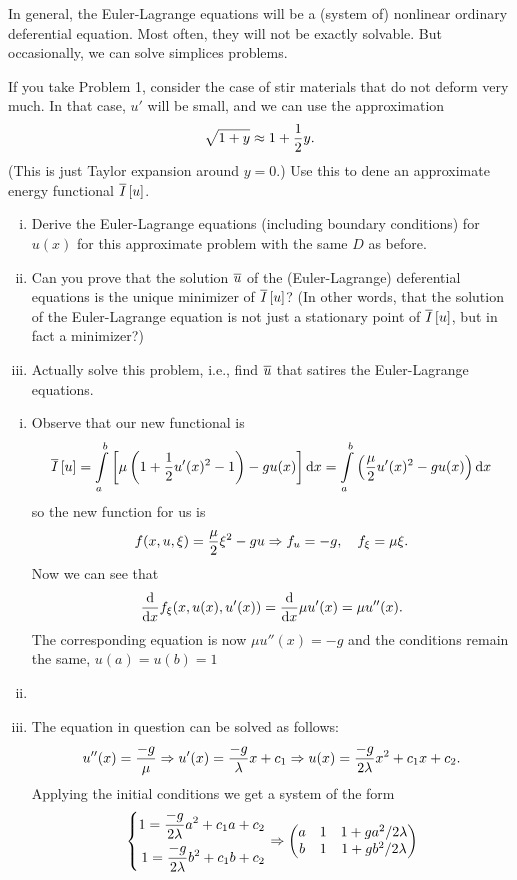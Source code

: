 \documentclass[12pt]{memoir}
\begin{document}
\begin{Ej}
    In general, the Euler-Lagrange equations will be a (system
    of) nonlinear ordinary deferential equation. Most often, they will not be exactly solvable. But occasionally,
    we can solve simplices problems.\par
    If you take Problem 1, consider the case of stir materials that do not deform very much. In that case, $u'$
    will be small, and we can use the approximation
    $$\sqrt{1+y}\approx 1+\half y.$$
    (This is just Taylor expansion around $y = 0$.) Use this to dene an approximate energy functional $\overline I\left\lbrack u\right\rbrack$.
    \begin{enumerate}[i)]
        \item Derive the Euler-Lagrange equations (including boundary conditions) for $u(x)$ for this approximate
        problem with the same $D$ as before.
        \item Can you prove that the solution $\overline u$ of the (Euler-Lagrange) deferential equations is the unique minimizer
        of $\overline I\left\lbrack u\right\rbrack$? (In other words, that the solution of the Euler-Lagrange equation is not just a stationary
        point of $\overline I\left\lbrack u\right\rbrack$, but in fact a minimizer?)
        \item Actually solve this problem, i.e., find $\overline u$ that satires the Euler-Lagrange equations.
    \end{enumerate}
\end{Ej}


\begin{ptcbr}
    \begin{enumerate}[i)]
        \item Observe that our new functional is 
        $$\ov I\bonj{u}=\int\limits_a^b \bonj{\mu\left(1+\half u'(x)^2-1\right)-gu(x)}\dd x=\int\limits_a^b \left(\frac{\mu}{2}u'(x)^2-gu(x)\right)\dd x$$
        so the new function for us is 
        $$f(x,u,\xi)=\frac{\mu}{2}\xi^2-gu\Rightarrow f_u=-g,\quad f_\xi=\mu\xi.$$
        Now we can see that
        $$\dv{x}f_{\xi}(x,u(x),u'(x))=\dv{x}\mu u'(x)=\mu u''(x).$$
        The corresponding equation is now $\mu u''(x)=-g$ and the conditions remain the same, $u(a)=u(b)=1$
        \item {}
        \item The equation in question can be solved as follows:
        $$u''(x)=\frac{-g}{\mu}\Rightarrow u'(x)=\frac{-g}{\lambda}x+c_1\Rightarrow u(x)=\frac{-g}{2\lambda}x^2+c_1x+c_2.$$
        Applying the initial conditions we get a system of the form 
        $$
        \left\lbrace
        \begin{aligned}
            1=\frac{-g}{2\lambda}a^2+c_1a+c_2\\
            1=\frac{-g}{2\lambda}b^2+c_1b+c_2
        \end{aligned}
        \right.\Rightarrow
        \begin{pmatrix} a & 1 & 1+ga^2/2\lambda\\ b & 1 & 1+gb^2/2\lambda \end{pmatrix}
        $$
    \end{enumerate}
\end{ptcbr}
\end{document}
